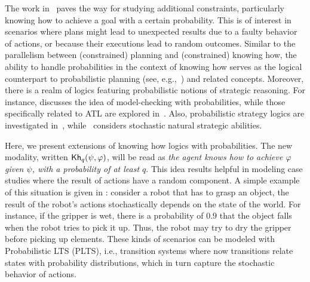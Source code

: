 The work in~\cite{DF23} paves the way for studying additional constraints, particularly knowing how to achieve a goal with a certain probability. This is of interest in scenarios where plans might lead to unexpected results due to a faulty behavior of actions,  or because their executions lead to random outcomes. Similar to the parallelism between (constrained) planning and (constrained) knowing how, the ability to handle probabilities in the context of knowing how serves as the logical counterpart to probabilistic planning (see, e.g.,~\cite{MadaniHC99}) and related concepts. Moreover, there is a realm of logics featuring probabilistic notions of strategic reasoning. For instance, \cite{BaierAFK18} discusses the idea of model-checking with probabilities, while those specifically related to ATL are explored in~\cite{BA95,TJ07,BullingJ09}. Also, probabilistic strategy logics are investigated in~\cite{AKMM19}, while~\cite{BerthonKMM24} considers stochastic natural strategic abilities. %

Here, we present extensions of knowing how logics with probabilities. The new modality, written ${\mathsf{Kh}}_q(\psi,\varphi)$, will be read as \emph{the agent knows how to achieve $\varphi$ given $\psi$, with a probability of at least $q$}. This idea results helpful in modeling case studies where the result of actions have a random component. A simple example of this situation is given in \cite{Kushmerick1995}: consider a robot that has to grasp an object,  the result of the robot's actions stochastically depends on the state of the world. For instance,  if the gripper is wet,  there is  a probability of $0.9$ that the object falls when the robot tries to pick it up.  Thus,  the robot may try to dry the gripper before picking up elements.   These kinds of scenarios can be modeled with Probabilistic LTS (PLTS), i.e., transition systems where now transitions relate states with probability distributions,  which in turn  capture the stochastic behavior of actions.

